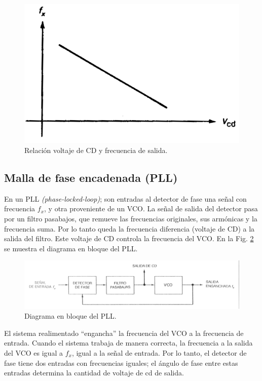 \documentclass[10pt,a4paper]{IEEEtran}
\begin{document}
    \begin{figure}[H]
        \centering
        \includegraphics[scale=0.3]{vco2.png}
        \caption{Relación voltaje de CD y frecuencia de salida.}
        \label{vco2}
    \end{figure}
    
    \subsection{Malla de fase encadenada (PLL)}
    En un PLL \emph{(phase-locked-loop)}; son entradas al detector de fase una señal con frecuencia $f_x$, y otra proveniente de un VCO. La señal de salida del detector pasa por un filtro pasabajos, que remueve las frecuencias originales, sus armónicas y la frecuencia suma. Por lo tanto queda la frecuencia diferencia (voltaje de CD) a la salida del filtro. Este voltaje de CD controla la frecuencia del VCO. En la Fig. \ref{pll1} se muestra el diagrama en bloque del PLL.
    
    \begin{figure}[H]
        \centering
        \includegraphics[scale=0.2]{pll1.png}
        \caption{Diagrama en bloque del PLL.}
        \label{pll1}
    \end{figure}
    El sistema realimentado “engancha” la frecuencia del VCO a la frecuencia de entrada. Cuando el sistema trabaja de manera correcta, la frecuencia a la salida del VCO es igual a $f_x$, igual a la señal de entrada. Por lo tanto, el 
    detector de fase tiene dos entradas con frecuencias iguales; el ángulo de fase entre estas entradas determina la cantidad de voltaje de cd de salida. 
    
\end{document}
